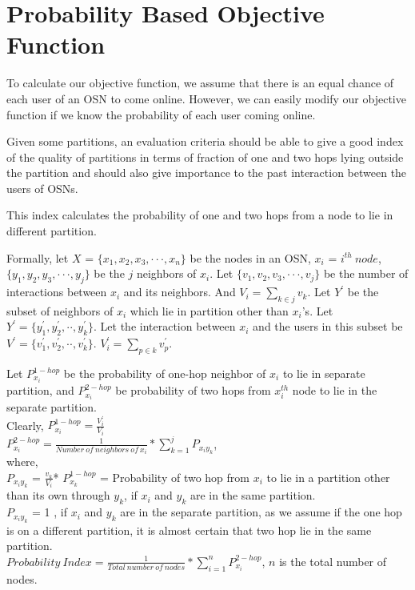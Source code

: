 \documentclass[letterpaper]{article}
\begin{document}
\section{Probability Based Objective Function}

   To calculate our objective function, we assume that there is an equal chance
of each user of an OSN to come online. However, we can easily modify our
objective function if we know the probability of each user coming online.

 Given some partitions, an evaluation criteria should be able to give a good
index of the quality of partitions in terms of fraction of one and two hops
lying outside the partition and should also give importance to the past
interaction between the users of OSNs. 
  
This index calculates the probability of one and two hops from a node to lie in different partition. 

Formally, let $X$ = $\{x_1,x_2,x_3,\cdot\cdot\cdot,x_n\}$ be the nodes in an OSN, $x_i$ = $i^{th}\ node$, 
$\{y_1, y_2, y_3,\cdot\cdot\cdot,y_j\}$ be the $j$ neighbors of $x_i$. Let $\{v_1, v_2, v_3, \cdot\cdot\cdot,
 v_j\}$ be the number of interactions between $x_i$ and its neighbors. And $V_i = \sum_{k\in j} v_k$.
 Let $Y^\prime$ be 
the subset of neighbors of $x_i$ which lie in partition other than $x_i$'s. Let $Y^\prime = \{y_1^\prime, y_2^\prime, \cdot\cdot, y_k^\prime\}$. Let the interaction between $x_i$ and the users in this subset be  $V^\prime = \{v_1^\prime, v_2^\prime, \cdot\cdot, v_k^\prime\}$.
$V_i^\prime = \sum_{p\in k} v_p^\prime$.

        Let $P_{x_i}^{1-hop}$ be the probability of one-hop neighbor of $x_i$ to lie in separate partition, and $P_{x_i}^{2-hop}$ be probability of two hops from $x_i^{th}$ node to lie in the separate partition.\\
        Clearly, $P_{x_i}^{1-hop}= \frac{V_i^\prime}{V_i}$ \\
        $P_{x_i}^{2-hop}=\frac{1}{Number\ of\ neighbors\ of\ x_i} * \displaystyle\sum_{k=1}^j P_{x_i y_k}$, \\
        where,\\
        $P_{x_i y_k}$ = $\frac{v_k}{V_i}$* $P_{x_{k}}^{1-hop}$ =  Probability of two hop from  $x_{i}$ to lie  in a  partition other than  its own through $y_k$, if $x_i$ and $y_{k}$ are in the same partition.\\
        $P_{x_i y_k}$ =  1 , if $x_i$ and $y_k$ are in the separate partition, as we assume if the one hop is on a different partition, it is almost
certain that two hop lie in the same partition.\\
        $Probability\ Index=\frac{1}{Total\ number\ of\ nodes}*\displaystyle\sum_{i=1}^nP_{x_i}^{2-hop}$, $n$ is the total number of nodes.\\
\end{document}
